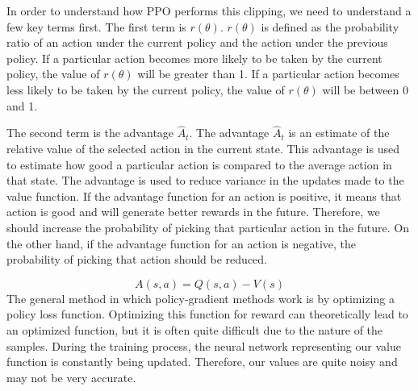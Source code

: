 In order to understand how PPO performs this clipping, we need to
understand a few key terms first. The first term is
$r(\theta)$. $r(\theta)$ is defined as the probability ratio of an
action under the current policy and the action under the previous
policy. If a particular action becomes more likely to be taken by the
current policy, the value of $r(\theta)$ will be greater than 1. If a
particular action becomes less likely to be taken by the current
policy, the value of $r(\theta)$ will be between 0 and 1.





The second term is the advantage $\hat{A}_{t}$. The advantage
$\hat{A}_{t}$ is an estimate of the relative value of the selected
action in the current state. This advantage is used to estimate how
good a particular action is compared to the average action in that
state. The advantage is used to reduce variance in the updates made to
the value function. If the advantage function for an action is
positive, it means that action is good and will generate better
rewards in the future. Therefore, we should increase the probability
of picking that particular action in the future. On the other hand, if
the advantage function for an action is negative, the probability of
picking that action should be reduced.

\begin{equation}
    A(s,a) = Q(s,a) - V(s)
\end{equation}
The general method in which policy-gradient methods work is by
optimizing a policy loss function. Optimizing this function for reward
can theoretically lead to an optimized function, but it is often quite
difficult due to the nature of the samples. During the training
process, the neural network representing our value function is
constantly being updated. Therefore, our values are quite noisy and
may not be very accurate.

